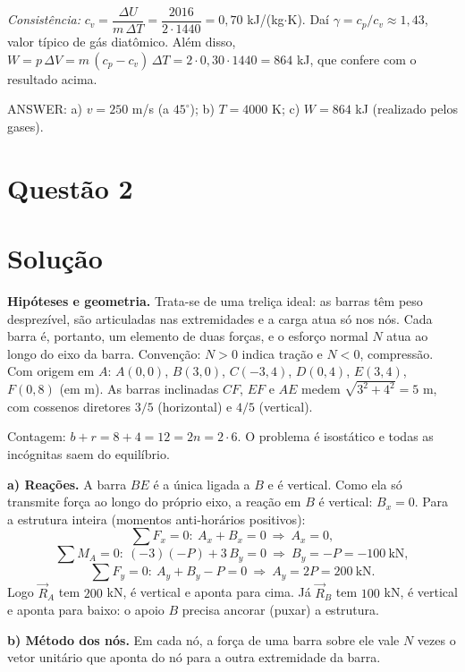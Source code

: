 \documentclass{article}%
\begin{document}
\emph{Consistência:} $c_v=\dfrac{\Delta U}{m\,\Delta T}=\dfrac{2016}{2\cdot1440}=0{,}70$ kJ/(kg$\cdot$K). Daí $\gamma=c_p/c_v\approx1{,}43$, valor típico de gás diatômico. Além disso, $W=p\,\Delta V=m\,(c_p-c_v)\,\Delta T=2\cdot0{,}30\cdot1440=864$ kJ, que confere com o resultado acima.

ANSWER: a) $v=250$ m/s (a $45^\circ$); b) $T=4000$ K; c) $W=864$ kJ (realizado pelos gases).%
\newpage%
\section*{Questão 2}

\section*{Solução}

\textbf{Hipóteses e geometria.} Trata-se de uma treliça ideal: as barras têm peso desprezível, são articuladas nas extremidades e a carga atua só nos nós. Cada barra é, portanto, um elemento de duas forças, e o esforço normal $N$ atua ao longo do eixo da barra. Convenção: $N>0$ indica tração e $N<0$, compressão. Com origem em $A$: $A(0,0)$, $B(3,0)$, $C(-3,4)$, $D(0,4)$, $E(3,4)$, $F(0,8)$ (em m). As barras inclinadas $CF$, $EF$ e $AE$ medem $\sqrt{3^2+4^2}=5$ m, com cossenos diretores $3/5$ (horizontal) e $4/5$ (vertical).

Contagem: $b+r=8+4=12=2n=2\cdot 6$. O problema é isostático e todas as incógnitas saem do equilíbrio.

\textbf{a) Reações.} A barra $BE$ é a única ligada a $B$ e é vertical. Como ela só transmite força ao longo do próprio eixo, a reação em $B$ é vertical: $B_x=0$. Para a estrutura inteira (momentos anti-horários positivos):
\[
\sum F_x=0:\ A_x+B_x=0\ \Rightarrow\ A_x=0,
\]
\[
\sum M_A=0:\ (-3)(-P)+3\,B_y=0\ \Rightarrow\ B_y=-P=-100\ \text{kN},
\]
\[
\sum F_y=0:\ A_y+B_y-P=0\ \Rightarrow\ A_y=2P=200\ \text{kN}.
\]
Logo $\vec R_A$ tem $200$ kN, é vertical e aponta para cima. Já $\vec R_B$ tem $100$ kN, é vertical e aponta para baixo: o apoio $B$ precisa ancorar (puxar) a estrutura.

\textbf{b) Método dos nós.} Em cada nó, a força de uma barra sobre ele vale $N$ vezes o vetor unitário que aponta do nó para a outra extremidade da barra.
\end{document}
